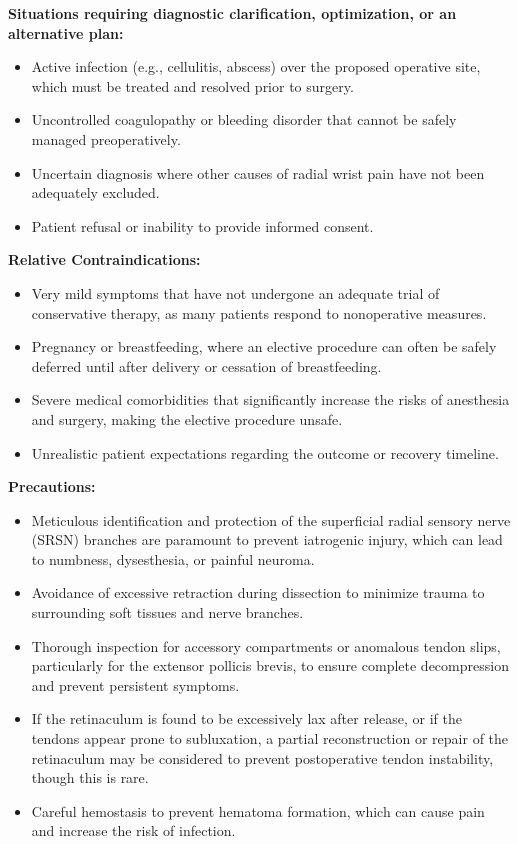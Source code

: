 \textbf{Situations requiring diagnostic clarification, optimization, or an alternative plan:}
\begin{itemize}
  \item Active infection (e.g., cellulitis, abscess) over the proposed operative site, which must be treated and resolved prior to surgery.
  \item Uncontrolled coagulopathy or bleeding disorder that cannot be safely managed preoperatively.
  \item Uncertain diagnosis where other causes of radial wrist pain have not been adequately excluded.
  \item Patient refusal or inability to provide informed consent.
\end{itemize}

\textbf{Relative Contraindications:}
\begin{itemize}
  \item Very mild symptoms that have not undergone an adequate trial of conservative therapy, as many patients respond to nonoperative measures.
  \item Pregnancy or breastfeeding, where an elective procedure can often be safely deferred until after delivery or cessation of breastfeeding.
  \item Severe medical comorbidities that significantly increase the risks of anesthesia and surgery, making the elective procedure unsafe.
  \item Unrealistic patient expectations regarding the outcome or recovery timeline.
\end{itemize}

\textbf{Precautions:}
\begin{itemize}
  \item Meticulous identification and protection of the superficial radial sensory nerve (SRSN) branches are paramount to prevent iatrogenic injury, which can lead to numbness, dysesthesia, or painful neuroma.
  \item Avoidance of excessive retraction during dissection to minimize trauma to surrounding soft tissues and nerve branches.
  \item Thorough inspection for accessory compartments or anomalous tendon slips, particularly for the extensor pollicis brevis, to ensure complete decompression and prevent persistent symptoms.
  \item If the retinaculum is found to be excessively lax after release, or if the tendons appear prone to subluxation, a partial reconstruction or repair of the retinaculum may be considered to prevent postoperative tendon instability, though this is rare.
  \item Careful hemostasis to prevent hematoma formation, which can cause pain and increase the risk of infection.
\end{itemize}


